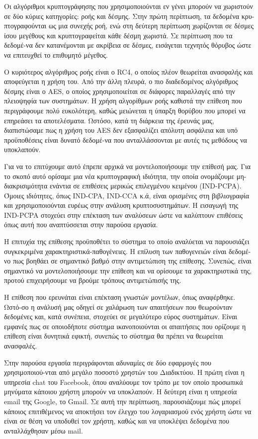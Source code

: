 Οι αλγόριθμοι κρυπτογράφησης που χρησιμοποιούνται εν γένει μπορούν να χωριστούν
σε δύο κύριες κατηγορίες: ροής και δέσμης. Στην πρώτη περίπτωση, τα δεδομένα
κρυ-πτογραφούνται ως μια συνεχής ροή, ενώ στη δεύτερη περίπτωση χωρίζονται σε
δέσμες ίσου μεγέθους και κρυπτογραφείται κάθε δέσμη χωριστά. Σε περίπτωση που τα
δεδομέ-να δεν κατανέμονται με ακρίβεια σε δέσμες, εισάγεται τεχνητός θόρυβος
ώστε να επιτευχθεί το επιθυμητό μέγεθος.

Ο κυριότερος αλγόριθμος ροής είναι ο RC4, ο οποίος πλέον θεωρείται ανασφαλής και
αποφεύγεται η χρήση του. Από την άλλη πλευρά, ο πιο διαδεδομένος αλγόριθμος
δέσμης είναι ο AES, ο οποίος χρησιμοποιείται σε διάφορες παραλλαγές από την
πλειοψηφία των συστημάτων. Η χρήση αλγορίθμων ροής καθιστά την επίθεση που
περιγράφουμε πολύ ευκολότερη, καθώς μειώνεται η ύπαρξη θορύβου που μπορεί να
επηρεάσει τα αποτελέσματα. Ωστόσο, κατά τη διάρκεια της έρευνάς μας, διαπιστώσαμε πως η
χρήση του AES δεν εξασφαλίζει απόλυτη ασφάλεια και υπό προϋποθέσεις είναι δυνατό
δεδομέ-να που ανταλλάσσονται με αυτές τις μεθόδους να υποκλαπούν.

Για να το επιτύχουμε αυτό έπρεπε αρχικά να μοντελοποιήσουμε την επίθεσή μας. Για
το σκοπό αυτό ορίσαμε μια νέα κρυπτογραφική ιδιότητα, την οποία ονομάζουμε
μη-διακρισιμότητα ενάντια σε επιθέσεις μερικώς επιλεγμένου κειμένου (IND-PCPA). Όμοιες
ιδιότητες, όπως IND-CPA, IND-CCA κ.ά, είναι ορισμένες στη βιβλιογραφία και
χρησιμοποιούνται ευρέως στην ανάλυση κρυπτοσυστημάτων. Η εισαγωγή της IND-PCPA
στοχεύει στην επέκταση των αναλύσεων ώστε να καλύπτουν επιθέσεις όπως αυτή που
αναπτύσσεται στην παρούσα εργασία.

Η επιτυχία της επίθεσης προϋποθέτει το σύστημα το οποίο αναλύεται να παρουσιάζει
συγκεκριμένα χαρακτηριστικά-παθογένειες. Η επίλυση των παθογενειών είναι
δεδομέ-νο πως βοηθάει σε σημαντικό βαθμό στην αντιμετώπιση της επίθεσης. Συνεπώς,
είναι σημαντικό να μοντελοποιήσουμε την επίθεση και να ορίσουμε τα
χαρακτηριστικά της, προτού επιχειρήσουμε να βρούμε τρόπους αντιμετώπισής της.

Η επίθεση που ερευνάται είναι επέκταση γνωστών μοντέλων, όπως αναφέρθηκε. Ωστό-σο
η ανάλυσή μας οδηγεί σε χαλάρωση των απαιτήσεων που θεωρούνταν δεδομένες και,
κατά συνέπεια, στοχεύει σε μεγαλύτερο εύρος συστημάτων. Είναι εμφανές πως
σε οποιοδήποτε σύστημα ικανοποιούνται οι απαιτήσεις που ορίζουμε η επίθεση είναι
δυνητικά εφικτή, συνεπώς το σύστημα θα πρέπει να θεωρείται ανασφαλές.

Στην παρούσα εργασία περιγράφονται αδυναμίες σε δύο εφαρμογές που
χρησιμοποιού-νται από μεγάλο ποσοστό χρηστών του Διαδικτύου. Η πρώτη είναι η
υπηρεσία chat του Facebook, όπου αναλύουμε τον τρόπο με τον οποίο προσωπικά
μηνύματα κάποιου χρήστη μπορούν να υποκλαπούν. Η δεύτερη είναι η υπηρεσία email
της Google, το Gmail. Σε αυτή την περίπτωση, παρουσιάζουμε πώς μπορεί κάποιος
επιτιθέμενος να αποκτήσει τον έλεγχο του λογαριασμού ενός χρήστη ώστε να είναι
σε θέση να υποδυθεί τον χρήστη, καθώς και να υποκλέψει δεδομένα που
ανταλλάχθησαν μέσω mail.

